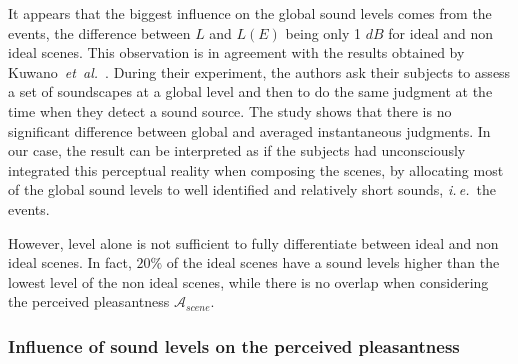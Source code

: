 \documentclass[12pt]{elsarticle}
\newcommand{\ie}{\emph{i.\,e.}}
\newcommand{\al}{\emph{et~al.}}
\begin{document}

It appears that the biggest influence on the global sound levels comes from the events, the difference between $L$ and $L(E)$ being only 1 $dB$ for ideal and non ideal scenes. This observation is in agreement with the results obtained by Kuwano~\al~\cite{kuwano_memory_2003}. During their experiment, the authors ask their subjects to assess a set of soundscapes at a global level and then to do the same judgment at the time when they detect a sound source. The study shows that there is no significant difference between global and averaged instantaneous judgments. In our case, the result can be interpreted as if the subjects had unconsciously integrated this perceptual reality when composing the scenes, by allocating most of the global sound levels to well identified and relatively short sounds, \ie~the events.


However, level alone is not sufficient to fully differentiate between ideal and non ideal scenes. In fact, $20\%$ of the ideal scenes have a sound levels higher than the lowest level of the non ideal scenes, while there is no overlap when considering the perceived pleasantness $\mathcal{A}_{scene}$.

\subsubsection*{Influence of sound levels on the perceived pleasantness}
\end{document}
